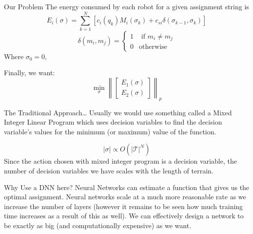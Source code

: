 \documentclass[aspectratio=169, 10pt]{beamer} %
\begin{document}
\begin{frame}{Our Problem}
The energy consumed by each robot for a given assignment string is
\begin{equation}
  E_i(\sigma) = \sum_{ k=1 }^N\left[ c_i(q_k) M_i(\sigma_k)+c_{si} \delta( {\sigma_{k-1},\sigma_k} )\right]
\end{equation}
\begin{equation}
  \delta(m_i,m_j) = \begin{cases}
    1 & \text{ if } m_i \neq m_j \\
    0 & \text{otherwise}
  \end{cases}
\end{equation}
Where $\sigma_0=0$,\par
Finally, we want:
\begin{equation}
  \min_\sigma \left\|\begin{bmatrix}
    E_1(\sigma)\\E_2(\sigma)
  \end{bmatrix}\right\|_p
\end{equation}
\end{frame}
\begin{frame}{The Traditional Approach\dots}
  Usually we would use something called a Mixed Integer Linear Program which uses decision variables to find the decision variable's values for the minimum (or maximum) value of the function. 
\par
\begin{equation}
    |\sigma| \propto O(|\mathcal{T}|^N)
\end{equation}
    Since the action chosen with mixed integer program is a decision variable, the number of decision variables we have scales with the length of terrain.
\end{frame}

\begin{frame} {Why Use a DNN here?}
  Neural Networks can estimate a function that gives us the optimal assignment. Neural networks scale at a much more reasonable rate as we increase the number of layers (however it remains to be seen how much training time increases as a result of this as well).
  We can effectively design a network to be exactly as big (and computationally expensive) as we want.
\end{frame}
\end{document}
